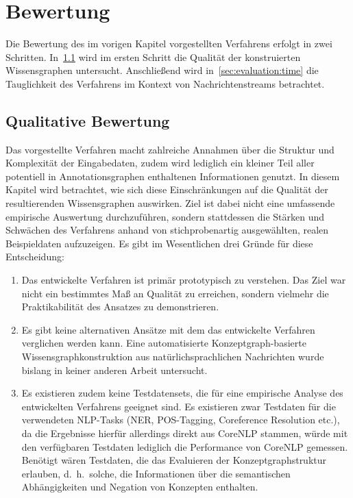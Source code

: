 \chapter{Bewertung}%
\label{sec:evaluation}

Die Bewertung des im vorigen Kapitel vorgestellten Verfahrens erfolgt in zwei Schritten.
In~\ref{sec:evaluation:quality} wird im ersten Schritt die Qualität der konstruierten Wissensgraphen untersucht.
Anschließend wird in~\ref{sec:evaluation:time} die Tauglichkeit des Verfahrens im Kontext von Nachrichtenstreams betrachtet.

\section{Qualitative Bewertung}%
\label{sec:evaluation:quality}

Das vorgestellte Verfahren macht zahlreiche Annahmen über die Struktur und Komplexität der Eingabedaten, zudem wird lediglich ein kleiner Teil aller potentiell in Annotationsgraphen enthaltenen Informationen genutzt.
In diesem Kapitel wird betrachtet, wie sich diese Einschränkungen auf die Qualität der resultierenden Wissensgraphen auswirken.
Ziel ist dabei nicht eine umfassende empirische Auswertung durchzuführen, sondern stattdessen die Stärken und Schwächen des Verfahrens anhand von stichprobenartig ausgewählten, realen Beispieldaten aufzuzeigen.
Es gibt im Wesentlichen drei Gründe für diese Entscheidung:
\begin{enumerate}
	\item Das entwickelte Verfahren ist primär prototypisch zu verstehen.
		Das Ziel war nicht ein bestimmtes Maß an Qualität zu erreichen, sondern vielmehr die Praktikabilität des Ansatzes zu demonstrieren.
	\item Es gibt keine alternativen Ansätze mit dem das entwickelte Verfahren verglichen werden kann.
		Eine automatisierte Konzeptgraph-basierte Wissensgraphkonstruktion aus natürlichsprachlichen Nachrichten wurde bislang in keiner anderen Arbeit untersucht.
	\item Es existieren zudem keine Testdatensets, die für eine empirische Analyse des entwickelten Verfahrens geeignet sind.
		Es existieren zwar Testdaten für die verwendeten NLP-Tasks (NER, POS-Tagging, Coreference Resolution etc.), da die Ergebnisse hierfür allerdings direkt aus CoreNLP stammen, würde mit den verfügbaren Testdaten lediglich die Performance von CoreNLP gemessen.
		Benötigt wären Testdaten, die das Evaluieren der Konzept\-graph\-struktur erlauben, d.~h.\ solche, die Informationen über die semantischen Abhängigkeiten und Negation von Konzepten enthalten.
\end{enumerate}

